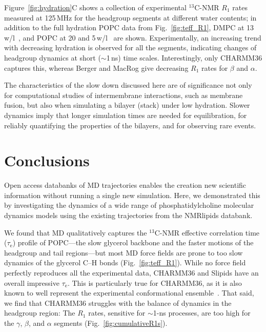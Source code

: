 \documentclass[journal=jcisd8,manuscript=article,layout=twocolumn]{achemso}
\begin{document}


Figure~\ref{fig:hydration}C shows
a collection of experimental $^{13}$C-NMR $R_1$ rates
measured at 125\,MHz for the headgroup segments
at different water contents;
in addition to the full hydration POPC data from Fig.~\ref{fig:teff_R1},
DMPC at 13\,w/l~\cite{pham15}, %
and POPC at 20 and 5\,w/l~\cite{Volke:1995a} %
are shown.
%
Experimentally, an increasing trend with decreasing hydration is observed for all the segments,
indicating changes of headgroup dynamics at short ($\sim$1\,ns) time scales.
Interestingly, only CHARMM36 captures this,
whereas Berger and MacRog give decreasing $R_1$ rates for $\beta$ and $\alpha$.
%

The characteristics of the slow down discussed here are of significance
not only for computational studies of inter\-membrane interactions, such as membrane fusion,  but also when simulating a bilayer (stack) under low hydration. Slower dynamics imply that longer simulation times are needed for equilibration, for reliably quantifying the properties of the bilayers, and for observing rare events. %

\section{Conclusions}
Open access databanks of MD trajectories enables the creation new scientific information without running a single new simulation. Here,
we demonstrated this by investigating the dynamics of a wide range of phosphatidylcholine molecular dynamics models using the existing trajectories from the NMRlipids databank.

We found that MD qualitatively captures the $^{13}$C-NMR effective correlation time ($\tau_\mathrm e$) profile of POPC---the slow glycerol backbone and the faster motions of the headgroup and tail regions---but most MD force fields are prone to too slow dynamics of the glycerol C--H bonds (Fig.~\ref{fig:teff_R1}).
%
While no force field perfectly reproduces all the experimental data,
CHARMM36 and Slipids have an overall impressive $\tau_\mathrm e$.
This is particularly true for CHARMM36, as it is also known to
well represent the experimental conformational ensemble~\cite{botan15}.
%
That said, we find that CHARMM36 struggles with the balance of dynamics in the headgroup region:
The $R_1$ rates, sensitive for $\sim$1-ns processes, are too high for the $\gamma$, $\beta$, and $\alpha$ segments (Fig.~\ref{fig:cumulativeR1s}).
\end{document}
